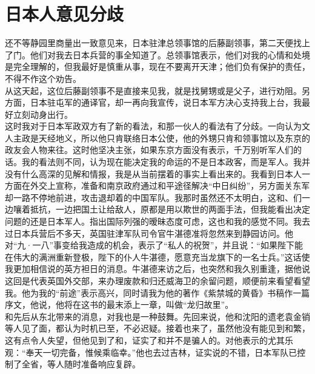 \fancyhead[RO]{} %
\fancyhead[LE]{} %
\chapter*{日本人意见分歧}
\thispagestyle{empty}
还不等静园里商量出一致意见来，日本驻津总领事馆的后藤副领事，第二天便找上了门。他们对我去日本兵营的事全知道了。总领事馆表示，他们对我的心情和处境是完全理解的，但我最好是慎重从事，现在不要离开天津；他们负有保护的责任，不得不作这个劝告。\\

从这天起，这位后藤副领事不是直接来见我，就是找舅甥或是父子，进行劝阻。另方面，日本驻屯军的通译官，却一再向我宣传，说日本军方决心支持我上台，我最好立刻动身出行。\\

这时我对于日本军政双方有了新的看法，和那一伙人的看法有了分歧。一向认为文人主政是天经地义，所以他只肯联络日本公使，他的外甥只肯和领事馆以及东京的政友会人物来往。这时他坚决主张，如果东京方面没有表示，千万别听军人们的话。我的看法则不同，认为现在能决定我的命运的不是日本政客，而是军人。我并没有什么高深的见解和情报，我是从当前摆着的事实上看出来的。我看到日本人一方面在外交上宣称，准备和南京政府通过和平途径解决“中日纠纷”，另方面关东军却一路不停地前进，攻击退却着的中国军队。我那时虽然还不太明白，这和、们一边嚷着抵抗，一边把国土让给敌人，原都是用以欺世的两面手法，但我能看出决定问题的还是日本军人。指出国际列强的暧昧态度可虑，这也和我的感觉不同。我去过日本兵营后不多天，英国驻津军队司令官牛湛德准将忽然来到静园访问。他对“九·一八”事变给我造成的机会，表示了“私人的祝贺”，并且说：“如果陛下能在伟大的满洲重新登极，陛下的仆人牛湛德，愿意充当龙旗下的一名士兵。”这话使我更加相信说的英方袒日的消息。牛湛德来访之后，也突然和我久别重逢，据他说这回是代表英国外交部，来办理废款和归还威海卫的余留问题，顺便前来看望看望我。他为我的“前途”表示高兴，同时请我为他的著作《紫禁城的黄昏》书稿作一篇序文，他说，他将在这书的最末添上一章，叫做“龙归故里”。\\

和先后从东北带来的消息，对我也是一种鼓舞。先回来说，他和沈阳的遗老袁金销等人见了面，都认为时机已至，不必迟疑。接着也来了，虽然他没有能见到和繁，这有点令人失望，但他见到了和，证实了和并不是骗人的。对他表示的尤其乐观：“奉天一切完备，惟候乘临幸。”他也去过吉林，证实说的不错，日本军队已控制了全省，等人随时准备响应复辟。\\


